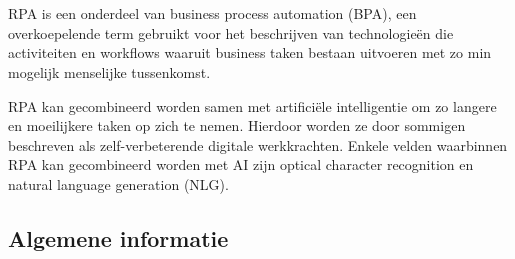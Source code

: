 \chapter{}
\label{ch:stand-van-zaken}





RPA is een onderdeel van business process automation (BPA), een overkoepelende term gebruikt voor het beschrijven van technologieën die activiteiten en workflows waaruit business taken bestaan uitvoeren met zo min mogelijk menselijke tussenkomst. \autocite{everythingRPA}

RPA kan gecombineerd worden samen met artificiële intelligentie om zo langere en moeilijkere taken op zich te nemen. Hierdoor worden ze door sommigen beschreven als zelf-verbeterende digitale werkkrachten. Enkele velden waarbinnen RPA kan gecombineerd worden met AI zijn optical character recognition en natural language generation (NLG). \autocite{everythingRPA}

\section{Algemene informatie}

